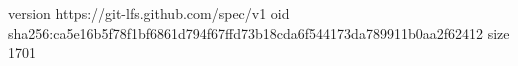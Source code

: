 version https://git-lfs.github.com/spec/v1
oid sha256:ca5e16b5f78f1bf6861d794f67ffd73b18cda6f544173da789911b0aa2f62412
size 1701
